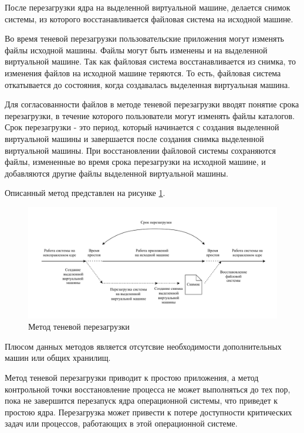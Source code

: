 После перезагрузки ядра на выделенной виртуальной машине, делается снимок системы, из которого восстанавливается файловая система на исходной машине.

Во время теневой перезагрузки пользовательские приложения могут изменять файлы исходной машины. Файлы могут быть изменены и на выделенной виртуальной машине. Так как файловая система восстанавливается из снимка, то изменения файлов на исходной машине теряются. То есть, файловая система откатывается до состояния, когда создавалась выделенная виртуальная машина.

Для согласованности файлов в методе теневой перезагрузки вводят понятие срока перезагрузки, в течение которого пользователи могут изменять файлы каталогов. Срок перезагрузки - это период, который начинается с создания выделенной виртуальной машины и завершается после создания снимка выделенной виртуальной машины. При восстановлении файловой системы сохраняются файлы, измененные во время срока перезагрузки на исходной машине, и добавляются другие файлы выделенной виртуальной машины. 

Описанный метод представлен на рисунке \ref{img:shadow-reboot}.

\begin{figure}[H]
	\begin{center}
		\includegraphics[scale=0.7]{img/shadow-reboot.pdf}
	\end{center}
	\captionsetup{justification=centering}
	\caption{Метод теневой перезагрузки}
	\label{img:shadow-reboot}
\end{figure}

Плюсом данных методов является отсутсвие необходимости дополнительных машин или общих хранилищ.

Метод теневой перезагрузки приводит к простою приложения, а метод контрольной точки восстановление процесса не может выполняться до тех пор, пока не завершится перезапуск ядра операционной системы, что приведет к простою ядра. Перезагрузка может привести к потере доступности критических задач или процессов, работающих в этой операционной системе.

